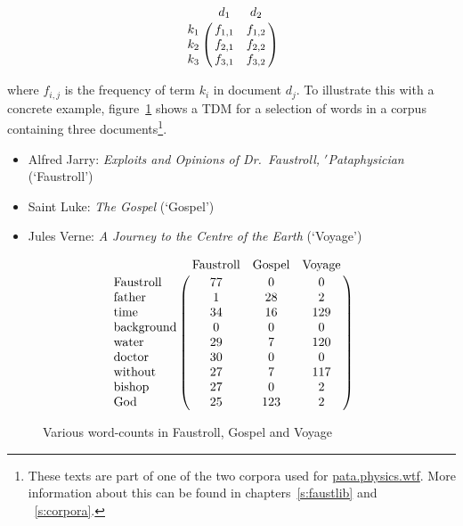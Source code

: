 \begin{equation}
  \bbordermatrix{~ & d_1 & d_2 \cr
        k_1 & f_{1,1} & f_{1,2} \cr
        k_2 & f_{2,1} & f_{2,2} \cr
        k_3 & f_{3,1} & f_{3,2}}
\label{eq:tdm}
\end{equation}

where $f_{i,j}$ is the frequency of term $k_{i}$ in document $d_{j}$. To illustrate this with a concrete example, figure~\ref{fig:termdocs} shows a \ac{TDM} for a selection of words in a corpus containing three documents\footnote{These texts are part of one of the two corpora used for \url{pata.physics.wtf}. More information about this can be found in chapters~\ref{s:faustlib} and ~\ref{s:corpora}.}.

\begin{itemize}
  \item Alfred Jarry: \textit{Exploits and Opinions of Dr.\ Faustroll, $'$Pataphysician} (`Faustroll') \autocite*{Jarry1996}
  \item Saint Luke: \textit{The Gospel} (`Gospel') \autocite*{Luke2005}
  \item Jules Verne: \textit{A Journey to the Centre of the Earth} (`Voyage') \autocite*{Verne2010}
\end{itemize}

\begin{figure}[!htbp]
\[
  \bbordermatrix{
    ~                  & \text{Faustroll} & \text{Gospel} & \text{Voyage} \cr
    \text{Faustroll}   & 77               & 0             & 0             \cr
    \text{father}      & 1                & 28            & 2             \cr
    \text{time}        & 34               & 16            & 129           \cr
    \text{background}  & 0                & 0             & 0             \cr
    \text{water}       & 29               & 7             & 120           \cr
    \text{doctor}      & 30               & 0             & 0             \cr
    \text{without}     & 27               & 7             & 117           \cr
    \text{bishop}      & 27               & 0             & 2             \cr
    \text{God}         & 25               & 123           & 2
  }
\]
\caption[Various word-counts]{Various word-counts in Faustroll, Gospel and Voyage}
\label{fig:termdocs}
\end{figure}


